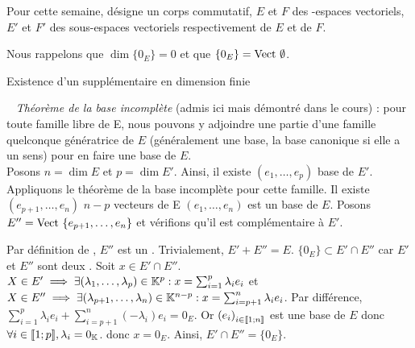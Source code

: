 \documentclass{article}
\date{13 Avril 2024}
\begin{document}
	\maketitle
	
	Pour cette semaine, \K désigne un corps commutatif, $E$ et $F$ des \K\!\!-espaces vectoriels, $E'$ et $F'$ des sous-espaces vectoriels respectivement de $E$ et de $F$.
	
	Nous rappelons que $\dim \{0_E\} = 0$ et que $\{0_E\} = \text{Vect } \emptyset$.
	
	\begin{question_kholle}
		{Existence d'un supplémentaire en dimension finie}
		
		~\newline
		\textit{Théorème de la base incomplète} (admis ici mais démontré dans le cours) : pour toute famille libre de E, nous pouvons y adjoindre une partie d'une famille quelconque génératrice de $E$ (généralement une base, la base canonique si elle a un sens) pour en faire une base de $E$. \\
		
		Posons $n = \dim E$ et $p = \dim E'$. Ainsi, il existe $(e_1, \ldots, e_p)$ base de $E'$.
		Appliquons le théorème de la base incomplète pour cette famille.
		Il existe $(e_{p+1}, \ldots, e_n)$ $n-p$ vecteurs de E \tq $(e_1, \ldots, e_n)$ est un base de $E$.
		Posons $E'' = \text{Vect } \{ e_{p+1}, \ldots, e_n \}$ et vérifions qu'il est complémentaire à $E'$.
		
		Par définition de \Vect\!\!, $E''$ est un \sev.
		Trivialement, $E' + E'' = E$.
		$\{0_E\} \subset E' \cap E''$ car $E'$ et $E''$ sont deux \sevs.
		Soit $x \in E' \cap E''$.
		$X \in E' \implies \exists (\lambda_1, \ldots, \lambda_p) \in \mathbb K^p : x = \sum_{i=1}^{p} \lambda_i e_i$ et 
		$X \in E'' \implies \exists (\lambda_{p+1}, \ldots, \lambda_n) \in \mathbb K^{n-p} : x = \sum_{i=p+1}^{n} \lambda_i e_i$.
		Par différence, $\sum_{i=1}^{p} \lambda_i e_i + \sum_{i=p+1}^{n} \left(-\lambda_i\right) e_i = 0_E$.
		Or $\left(e_i\right)_{i \in [\![ 1 ; n ]\!]}$ est une base de $E$ donc $\forall i \in [\![ 1 ; p ]\!], \lambda_i = 0_{\mathbb K}$.
		donc $x = 0_E$.
		Ainsi, $E' \cap E'' = \{0_E\}$.
	\end{question_kholle}
	
\end{document}
